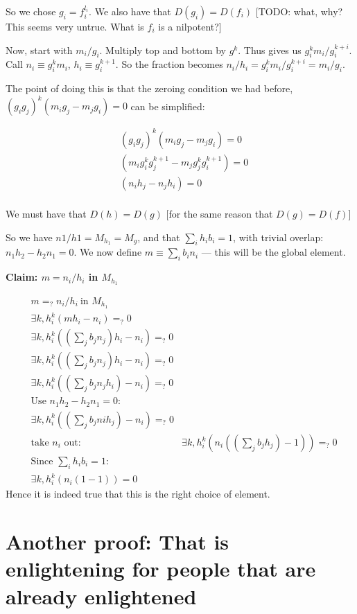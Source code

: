 \documentclass{book}
\theoremstyle{definition}
\begin{document}
So we chose $g_i = f_i^{l_i}$. We also have that $D(g_i) = D(f_i)$
[TODO: what, why? This seems very untrue. What is $f_i$ is a nilpotent?]


Now, start with $m_i/g_i$. Multiply top and bottom by $g^k$. Thus gives us
$g_i^k m_i/g_i^{k+i}$. Call $n_i \equiv g_i^k m_i$, $h_i \equiv g_i^{k+1}$. So 
the fraction becomes $n_i/h_i = g_i^k m_i/g_i^{k+i} = m_i/g_i$. 

The point of doing this is that the zeroing condition we had before, 
$(g_ig_j)^k (m_i g_j - m_j g_i) = 0$ can be simplified:


\begin{align*}
&(g_ig_j)^k (m_i g_j - m_j g_i) = 0  \\
&(m_i g_i^k g_j^{k+1} - m_j g_j^{k} g_i^{k+1}) = 0  \\
&(n_i h_j - n_j h_i) = 0  \\
\end{align*}

We must have that $D(h) = D(g)$ [for the same reason that $D(g) = D(f)$]

So we have $n1/h1 = M_{h_1} = M_g$, and that $\sum_i h_i b_i = 1$, with
trivial overlap: $n_1 h_2 - h_2 n_1 = 0$. We now define $m \equiv \sum_i b_i n_i$ ---
this will be the global element.

\textbf{Claim: $m = n_i /h_i$  in $M_{h_1}$}

\begin{align*}
&m =_? n_i/h_i ~ \text{in $M_{h_1}$} \\
&\exists k, h_i^k (m h_i - n_i) =_? 0  \\
&\exists k, h_i^k ((\sum_j b_j n_j) h_i - n_i) =_? 0  \\
&\exists k, h_i^k ((\sum_j b_j n_j) h_i - n_i) =_? 0  \\
&\exists k, h_i^k ((\sum_j b_j n_j h_i) - n_i) =_? 0  \\
&\text{Use $n_1 h_2 - h_2 n_1 = 0$:} \\
&\exists k, h_i^k ((\sum_j b_j ni h_j) - n_i) =_? 0  \\
&\text{take $n_i$ out: }
&\exists k, h_i^k (n_i ((\sum_j b_j h_j) - 1)) =_? 0  \\
&\text{Since $\sum_i h_i b_i = 1$:} \\
&\exists k, h_i^k (n_i (1 - 1)) = 0
\end{align*}
Hence it is indeed true that this is the right choice of element.

\section{Another proof: That is enlightening for people that are already enlightened}
\end{document}
